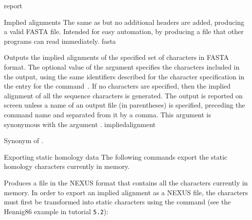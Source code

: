 \begin{command}{report}{}
\begin{arguments}
\begin{argumentgroup}{Implied alignments}
            {The same as  but no additional headers
                are added, producing a valid FASTA file. Intended for easy
                automation, by producing a file that other programs can read
                immediately.}
                {fasta}

                {Outputs the implied alignments of the specified
                set of characters in FASTA format. The optional value of the
                argument specifies the characters included
                in the output, using the same identifiers described for the
                character specification in the entry for the command~. If no
                characters are specified, then the implied alignment of all the
                sequence characters is generated. The output is reported on
                screen unless a name of an output file (in parentheses) is
                specified, preceding the command name and separated from it by a
                comma. This argument is synonymous with the argument
                .}
                {impliedalignment}

                {Synonym of .}
                {}

        \end{argumentgroup}

        \begin{argumentgroup}{Exporting static homology data}
            {The following commands export the static homology characters
            currently in memory.}

                {Produces a file in the NEXUS format that contains all the
                characters currently in memory.  In
                order to export an implied alignment as a NEXUS file, the
                characters must first be transformed into static characters
                using the  command (see the Hennig86 example in tutorial \texttt{5.2}): 
                \begin{flushleft}
                     \\
                \end{flushleft}}
                {}
                

\end{argumentgroup}
\end{arguments}
\end{command}
